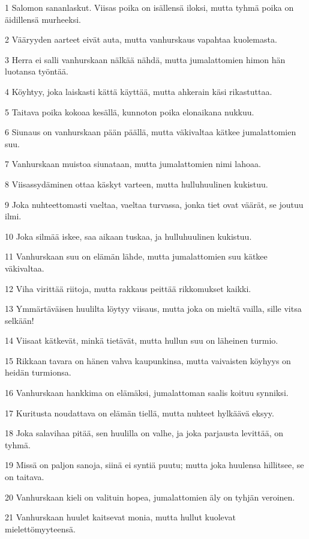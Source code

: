 \par 1 Salomon sananlaskut. Viisas poika on isällensä iloksi, mutta tyhmä poika on äidillensä murheeksi.
\par 2 Vääryyden aarteet eivät auta, mutta vanhurskaus vapahtaa kuolemasta.
\par 3 Herra ei salli vanhurskaan nälkää nähdä, mutta jumalattomien himon hän luotansa työntää.
\par 4 Köyhtyy, joka laiskasti kättä käyttää, mutta ahkerain käsi rikastuttaa.
\par 5 Taitava poika kokoaa kesällä, kunnoton poika elonaikana nukkuu.
\par 6 Siunaus on vanhurskaan pään päällä, mutta väkivaltaa kätkee jumalattomien suu.
\par 7 Vanhurskaan muistoa siunataan, mutta jumalattomien nimi lahoaa.
\par 8 Viisassydäminen ottaa käskyt varteen, mutta hulluhuulinen kukistuu.
\par 9 Joka nuhteettomasti vaeltaa, vaeltaa turvassa, jonka tiet ovat väärät, se joutuu ilmi.
\par 10 Joka silmää iskee, saa aikaan tuskaa, ja hulluhuulinen kukistuu.
\par 11 Vanhurskaan suu on elämän lähde, mutta jumalattomien suu kätkee väkivaltaa.
\par 12 Viha virittää riitoja, mutta rakkaus peittää rikkomukset kaikki.
\par 13 Ymmärtäväisen huulilta löytyy viisaus, mutta joka on mieltä vailla, sille vitsa selkään!
\par 14 Viisaat kätkevät, minkä tietävät, mutta hullun suu on läheinen turmio.
\par 15 Rikkaan tavara on hänen vahva kaupunkinsa, mutta vaivaisten köyhyys on heidän turmionsa.
\par 16 Vanhurskaan hankkima on elämäksi, jumalattoman saalis koituu synniksi.
\par 17 Kuritusta noudattava on elämän tiellä, mutta nuhteet hylkäävä eksyy.
\par 18 Joka salavihaa pitää, sen huulilla on valhe, ja joka parjausta levittää, on tyhmä.
\par 19 Missä on paljon sanoja, siinä ei syntiä puutu; mutta joka huulensa hillitsee, se on taitava.
\par 20 Vanhurskaan kieli on valituin hopea, jumalattomien äly on tyhjän veroinen.
\par 21 Vanhurskaan huulet kaitsevat monia, mutta hullut kuolevat mielettömyyteensä.
